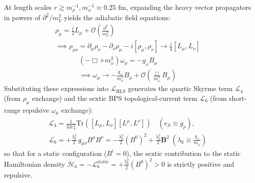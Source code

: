 \documentclass[10pt,aps,prd,twocolumn,superscriptaddress,nofootinbib,floatfix,longbibliography,showkeys]{revtex4-2}
\begin{document}
At length scales $r \gtrsim m_\rho^{-1}, m_\omega^{-1} \approx 0.25\text{ fm}$, expanding the heavy vector propagators in powers of $\partial^2 / m_V^2$ yields the adiabatic field equations:
\begin{multline}
\rho_\mu = \frac{i}{2}L_\mu + \mathcal{O}\!\left(\frac{\partial^2}{m_\rho^2}\right) \\
\implies \rho_{\mu\nu} = \partial_\mu \rho_\nu - \partial_\nu \rho_\mu - i[\rho_\mu, \rho_\nu] \longrightarrow \frac{i}{4}[L_\mu, L_\nu]
\end{multline}
\begin{multline}
\left(-\Box + m_\omega^2\right)\omega_\mu = -g_\omega B_\mu \\
\implies \omega_\mu \longrightarrow -\frac{g_\omega}{m_\omega^2} B_\mu + \mathcal{O}\!\left(\frac{\Box}{m_\omega^4}B_\mu\right)
\end{multline}
Substituting these expressions into $\mathcal{L}_{\text{HLS}}$ generates the quartic Skyrme term $\mathcal{L}_4$ (from $\rho_\mu$ exchange) and the sextic BPS topological-current term $\mathcal{L}_6$ (from short-range repulsive $\omega_\mu$ exchange):
\begin{equation}
\begin{gathered}
\mathcal{L}_4 = \frac{1}{32 e_S^2}\text{Tr}\!\left([L_\mu, L_\nu][L^\mu, L^\nu]\right) \quad \left(e_S \equiv g_\rho\right), \\
\mathcal{L}_6 = +\frac{\lambda_6^2}{2}\,g_{\mu\nu} B^\mu B^\nu = -\frac{\lambda_6^2}{2}(B^0)^2 + \frac{\lambda_6^2}{2}\mathbf{B}^2 \; \left(\lambda_6 \equiv \frac{g_\omega}{m_\omega}\right)
\end{gathered}
\end{equation}
so that for a static configuration ($B^i = 0$), the sextic contribution to the static Hamiltonian density $\mathcal{H}_6 = -\mathcal{L}_6^{\text{static}} = +\frac{\lambda_6^2}{2}(B^0)^2 > 0$ is strictly positive and repulsive.
\end{document}
